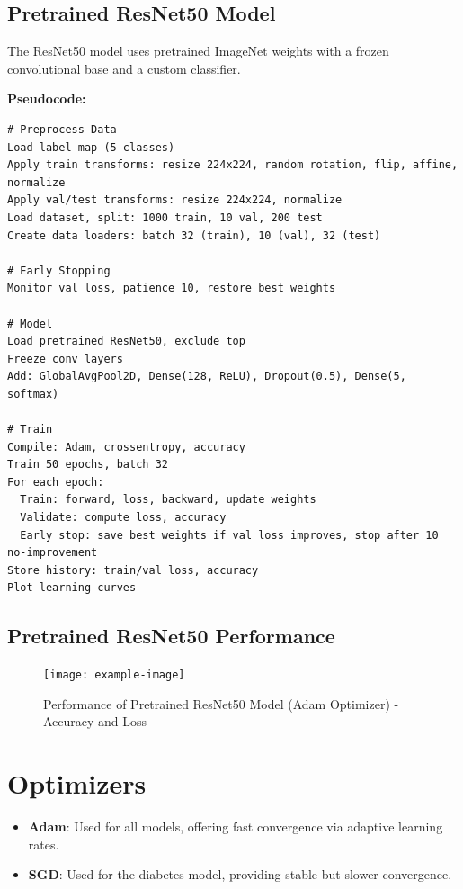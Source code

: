 \documentclass[a4paper,12pt]{article}
\begin{document}
\subsection*{Pretrained ResNet50 Model}
The ResNet50 model uses pretrained ImageNet weights with a frozen convolutional base and a custom classifier.

\textbf{Pseudocode:}
\begin{verbatim}
# Preprocess Data
Load label map (5 classes)
Apply train transforms: resize 224x224, random rotation, flip, affine, normalize
Apply val/test transforms: resize 224x224, normalize
Load dataset, split: 1000 train, 10 val, 200 test
Create data loaders: batch 32 (train), 10 (val), 32 (test)

# Early Stopping
Monitor val loss, patience 10, restore best weights

# Model
Load pretrained ResNet50, exclude top
Freeze conv layers
Add: GlobalAvgPool2D, Dense(128, ReLU), Dropout(0.5), Dense(5, softmax)

# Train
Compile: Adam, crossentropy, accuracy
Train 50 epochs, batch 32
For each epoch:
  Train: forward, loss, backward, update weights
  Validate: compute loss, accuracy
  Early stop: save best weights if val loss improves, stop after 10 no-improvement
Store history: train/val loss, accuracy
Plot learning curves
\end{verbatim}

\subsection*{Pretrained ResNet50 Performance}
\begin{figure}[H]
    \centering
    \texttt{[image: example-image]}
    \caption{Performance of Pretrained ResNet50 Model (Adam Optimizer) - Accuracy and Loss}
\end{figure}

\section*{Optimizers}
\begin{itemize}
    \item \textbf{Adam}: Used for all models, offering fast convergence via adaptive learning rates.
    \item \textbf{SGD}: Used for the diabetes model, providing stable but slower convergence.
\end{itemize}
\end{document}
